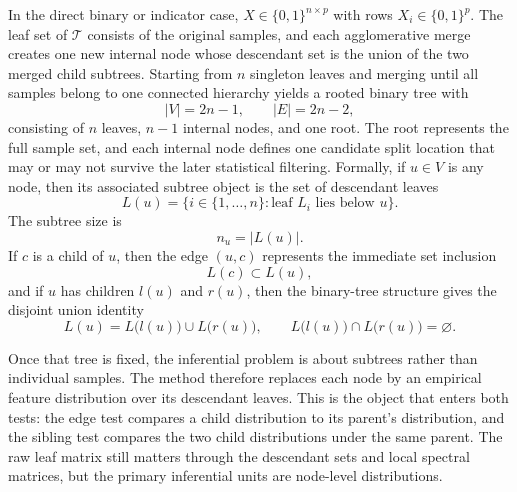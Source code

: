 In the direct binary or indicator case, $X \in \{0,1\}^{n \times p}$ with rows
$X_i \in \{0,1\}^p$. The leaf set of $\mathcal{T}$ consists of the original
samples, and each agglomerative merge creates one new internal node whose
descendant set is the union of the two merged child subtrees. Starting from $n$
singleton leaves and merging until all samples belong to one connected
hierarchy yields a rooted binary tree with
\begin{equation}
|V| = 2n-1,
\qquad
|E| = 2n-2,
\end{equation}
consisting of $n$ leaves, $n-1$ internal nodes, and one root. The root
represents the full sample set, and each internal node defines one candidate
split location that may or may not survive the later statistical filtering.
Formally, if $u \in V$ is any node, then its associated subtree object is the
set of descendant leaves
\begin{equation}
L(u) = \{ i \in \{1,\dots,n\} : \text{leaf } L_i \text{ lies below } u \}.
\end{equation}
The subtree size is
\begin{equation}
n_u = |L(u)|.
\end{equation}
If $c$ is a child of $u$, then the edge $(u,c)$ represents the immediate set
inclusion
\begin{equation}
L(c) \subset L(u),
\end{equation}
and if $u$ has children $l(u)$ and $r(u)$, then the binary-tree structure gives
the disjoint union identity
\begin{equation}
L(u) = L\bigl(l(u)\bigr) \cup L\bigl(r(u)\bigr),
\qquad
L\bigl(l(u)\bigr) \cap L\bigl(r(u)\bigr) = \varnothing.
\end{equation}

Once that tree is fixed, the inferential problem is about subtrees rather than
individual samples. The method therefore replaces each node by an empirical
feature distribution over its descendant leaves. This is the object that enters
both tests: the edge test compares a child distribution to its parent's
distribution, and the sibling test compares the two child distributions under
the same parent. The raw leaf matrix still matters through the descendant sets
and local spectral matrices, but the primary inferential units are node-level
distributions.

